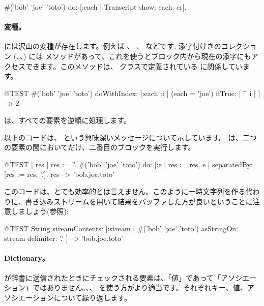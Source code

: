 \documentclass[a4paper,10pt,twoside]{book}
\begin{document}
\begin{code}{}
#('bob' 'joe' 'toto') do: [:each | Transcript show: each; cr].
\end{code}

\paragraph{変種。}  には沢山の変種が存在します。例えば 、 、  などです:
添字付けきのコレクション (、、) には  メソッドがあって、これを使うとブロック内から現在の添字にもアクセスできます。このメソッドは、 クラスで定義されている  に関係しています。

\begin{code}{@TEST}
#('bob' 'joe' 'toto') doWithIndex: [:each :i | (each = 'joe') ifTrue: [ ^ i ] ] --> 2
\end{code}

  は、すべての要素を逆順に処理します。

以下のコードは、 という興味深いメッセージについて示しています。
 は、二つの要素の間においてだけ、二番目のブロックを実行します。
\begin{code}{@TEST | res | }
res := ''.
#('bob' 'joe' 'toto') do: [:e | res := res, e ] separatedBy: [res := res, '.'].
res --> 'bob.joe.toto'
\end{code}
\noindent
このコードは、とても効率的とは言えません。このように一時文字列を作る代わりに、書き込みストリームを用いて結果をバッファした方が良いということに注意しましょう(参照):
\begin{code}{@TEST}
String streamContents: [:stream | #('bob' 'joe' 'toto') asStringOn: stream delimiter: '.' ] --> 'bob.joe.toto'
\end{code}



\paragraph{Dictionary。}
 が辞書に送信されたときにチェックされる要素は、「値」であって「アソシエーション」ではありません。、、  を使う方がより適当です。それぞれキー、値、アソシエーションについて繰り返します。
\end{document}
